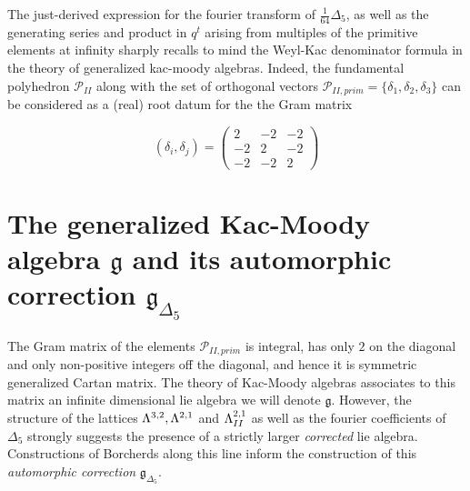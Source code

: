 \documentclass[9pt]{amsart} \usepackage[utf8]{inputenc}
\newcommand{\Poly}{\mathcal{P}}
\newcommand{\bkm}{\mathfrak{g}}
\newcommand{\autcor}{\mathfrak{g}_{\Delta_5}}
\begin{document}
The just-derived expression for the fourier transform of $\frac{1}{64}
\Delta_5$, as well as the generating series and product in $q^t$ arising
from multiples of the primitive elements at infinity sharply recalls to
mind the Weyl-Kac denominator formula in the theory of generalized
kac-moody algebras. Indeed, the fundamental polyhedron $\Poly_{II}$
along with the set of orthogonal vectors $\Poly_{II,prim} =
\{\delta_1,\delta_2,\delta_3\}$ can be considered as a (real) root datum
for
the the Gram matrix

$$(\delta_i,\delta_j) = \begin{pmatrix}2 & -2 & -2\\-2 & 2 & -2\\-2 & -2 & 2\end{pmatrix}$$

\section{The generalized Kac-Moody algebra $\bkm$ and its automorphic
correction $\autcor$}

The Gram matrix of the elements $\Poly_{II,prim}$ is integral, has only $2$
on the diagonal and only non-positive integers off the diagonal, and
hence it is symmetric generalized Cartan matrix. The theory of Kac-Moody
algebras associates to this matrix an infinite dimensional lie algebra we will denote
$\bkm$. However, the structure of the lattices
$\Lambda^{3,2}, \Lambda^{2,1}$ and $\Lambda^{2,1}_{II}$ as well as the fourier
coefficients of $\Delta_5$ strongly suggests the
presence of a strictly larger \textit{corrected} lie algebra.
Constructions of Borcherds along this line inform the construction of
this \textit{automorphic correction} $\autcor$.
\end{document}
